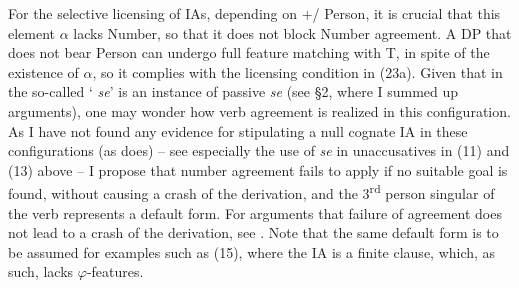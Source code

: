 \documentclass[output=paper]{langsci/langscibook}
\begin{document}
For the selective licensing of IAs, depending on +/\textminus{} Person, it is crucial that this element $\alpha $ lacks Number, so that it does not block Number agreement. A DP that does not bear Person can undergo full feature matching with T, in spite of the existence of $\alpha $, so it complies with the licensing condition in (23a). Given that in  the so-called ‘ \textit{se}' is an instance of passive \textit{se} (see §2, where I summed up  arguments), one may wonder how verb agreement is realized in this configuration. As I have not found any evidence for stipulating a null cognate IA in these configurations (as \citealt{Dobrovie-Sorin1998} does) – see especially the use of  \textit{se} in unaccusatives in (11) and (13) above – I propose that number agreement fails to apply if no suitable goal is found, without causing a crash of the derivation, and the 3\textsuperscript{rd} person singular of the verb represents a default form. For arguments that failure of agreement does not lead to a crash of the derivation, see \citet{Preminger2014}. Note that the same default form is to be assumed for examples such as (15), where the IA is a finite clause, which, as such, lacks $\varphi $-features.
\end{document}
